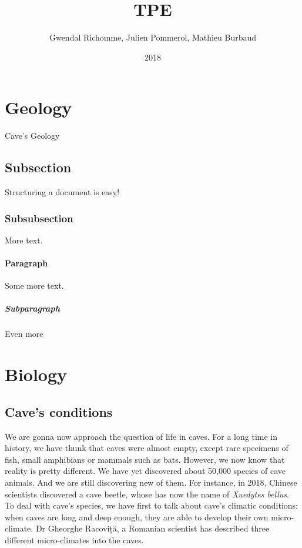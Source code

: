 \documentclass{article}
\title{TPE}
\date{2018}
\author{Gwendal Richomme, Julien Pommerol, Mathieu Burbaud}
\begin{document}
\section{Geology}

Cave's Geology

\subsection{Subsection}

Structuring a document is easy!

\subsubsection{Subsubsection}

More text.

\paragraph{Paragraph}

Some more text.

\subparagraph{Subparagraph}

Even more

\newpage

\section{Biology}

\subsection{Cave’s conditions}

We are gonna now approach the question of life in caves. For a long time in history, we have thunk that caves were almost empty, except rare specimens of fish, small amphibians or mammals such as bats. However, we now know that reality is pretty different. We have yet discovered about 50,000 species of cave animals. And we are still discovering new of them. For instance, in 2018, Chinese scientists discovered a cave beetle, whose has now the name of \emph{Xuedytes bellus}.
\smallbreak
To deal with cave’s species, we have first to talk about cave’s climatic conditions: when caves are long and deep enough, they are able to develop their own micro-climate. Dr Gheorghe Racoviță, a Romanian scientist has described three different micro-climates into the caves.
\end{document}
